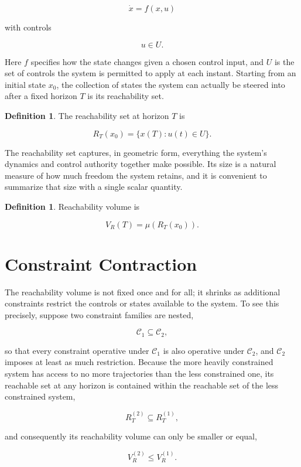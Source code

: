 \documentclass[11pt,oneside]{book}
\theoremstyle{plain}
\theoremstyle{definition}
\newtheorem{definition}[theorem]{Definition}
\theoremstyle{remark}
\begin{document}
\[
\dot x=f(x,u)
\]

with controls

\[
u\in U.
\]

Here \(f\) specifies how the state changes given a chosen control input, and \(U\) is the set of controls the system is permitted to apply at each instant. Starting from an initial state \(x_0\), the collection of states the system can actually be steered into after a fixed horizon \(T\) is its reachability set.

\begin{definition}
The reachability set at horizon
\(T\) is

\[
R_T(x_0)
=
\{
x(T)
:
u(t)\in U
\}.
\]
\end{definition}

The reachability set captures, in geometric form, everything the system's dynamics and control authority together make possible. Its size is a natural measure of how much freedom the system retains, and it is convenient to summarize that size with a single scalar quantity.

\begin{definition}
Reachability volume is

\[
V_R(T)
=
\mu(R_T(x_0)).
\]
\end{definition}

\section{Constraint Contraction}

The reachability volume is not fixed once and for all; it shrinks as additional constraints restrict the controls or states available to the system. To see this precisely, suppose two constraint families are nested,

\[
\mathcal C_1
\subseteq
\mathcal C_2,
\]

so that every constraint operative under \(\mathcal C_1\) is also operative under \(\mathcal C_2\), and \(\mathcal C_2\) imposes at least as much restriction. Because the more heavily constrained system has access to no more trajectories than the less constrained one, its reachable set at any horizon is contained within the reachable set of the less constrained system,

\[
R_T^{(2)}
\subseteq
R_T^{(1)},
\]

and consequently its reachability volume can only be smaller or equal,

\[
V_R^{(2)}
\le
V_R^{(1)}.
\]
\end{document}
